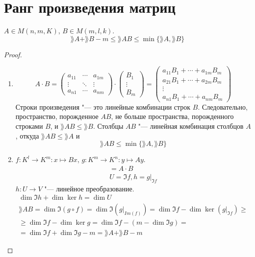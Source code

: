 ﻿	\section{Ранг произведения матриц}

\begin{theorem}
	$A \in M(n, m, K)$, $B \in M(m, l, k)$.
	\[\rang A + \rang B - m \le \rang AB \le \min\{\rang A, \rang B\} \]
\end{theorem}
\begin{proof}
	\begin{enumerate}
	\item
	\[
		A \cdot B = \begin{pmatrix}
			a_{11} & \cdots & a_{1m} \\
			\vdots & \ddots & \vdots \\
			a_{n1} & \cdots & a_{nm}
		\end{pmatrix} \cdot \begin{pmatrix}
			B_1    \\
			\vdots \\
			B_m
		\end{pmatrix} = \begin{pmatrix}
			a_{11}B_1 + \cdots + a_{1m}B_m \\
			a_{21}B_1 + \cdots + a_{2m}B_m \\
			\vdots \\
			a_{n1}B_1 + \cdots + a_{nm}B_m
		\end{pmatrix}
	\]
	Строки произведения "--- это линейные комбинации строк $B$.
	Следовательно, пространство, порожденное $AB$, не больше пространства, порожденного строками $B$, и $\rang AB \le \rang B$.
	Столбцы $AB$ "--- линейная комбинация столбцов $A$, откуда $\rang AB \le \rang A$ и
	\[ \rang AB \le \min\{\rang A, \rang B\} \]

	\item
		$f\colon K^l \to K^m\colon x \mapsto Bx$, $g\colon K^m \to K^n\colon y \mapsto Ay$.
		\begin{gather*}
			[g \circ f] = A \cdot B \\
			U = \Im f, h = g\bigr|_{\Im f}
		\end{gather*}
		$h\colon U \to V$ "--- линейное преобразование.
		\begin{gather*}
			\dim \Im h + \dim \ker h = \dim U \\
			\rang AB = \dim \Im (g \circ f) = \dim \Im \left(g \bigr|_{Im(f)}\right)
				= \dim \Im f - \dim \ker \left(g \bigr|_{\Im f}\right) \ge \\
			\ge \dim \Im f - \dim \ker g = \dim \Im f - (m - \dim \Im g) = \\
			= \dim \Im f + \dim \Im g - m = \rang A + \rang B - m
		\end{gather*}
	\end{enumerate}
\end{proof}
